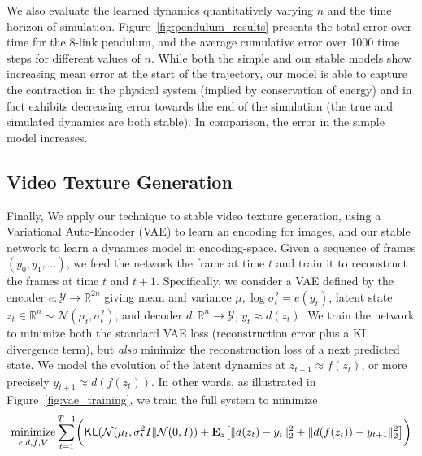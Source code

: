 

We also evaluate the learned dynamics quantitatively varying $n$ and the time horizon of simulation. Figure~\ref{fig:pendulum_results} presents the total error over time for the 8-link pendulum, and the average cumulative error over 1000 time steps for different values of $n$.  While both the simple and our stable models show increasing mean error at the start of the trajectory, our model is able to capture the contraction in the physical system (implied by conservation of energy) and in fact exhibits decreasing error towards the end of the simulation (the true and simulated dynamics are both stable). In comparison, the error in the simple model increases.

\subsection{Video Texture Generation}

Finally, We apply our technique to stable video texture generation, using a Variational Auto-Encoder (VAE) \citep{kingma2013auto} to learn an encoding for images, and our stable network to learn a dynamics model in encoding-space.  Given a sequence of frames $(y_0, y_1, \ldots)$, we feed the network the frame at time $t$
and train it to reconstruct the frames at time $t$ and $t+1$.  Specifically, we consider a VAE defined by the encoder $e : \mathcal{Y} \rightarrow \mathbb{R}^{2n}$ giving mean and variance $\mu, \log \sigma^2_t = e(y_t)$, latent state $z_t \in \mathbb{R}^n \sim \mathcal{N}(\mu_t, \sigma_t^2)$, and decoder $d: \mathbb{R}^n \rightarrow \mathcal{Y}$, $y_t \approx d(z_t)$.  We train the network to minimize both the standard VAE loss (reconstruction error plus a KL divergence term), but \emph{also} minimize the reconstruction loss of a next predicted state. We model the evolution of the latent dynamics at $z_{t+1} \approx f(z_t)$, or more precisely $y_{t+1} \approx d(f(z_t))$.  In other words, as illustrated in Figure~\ref{fig:vae_training}, we train the full system to minimize
\begin{align}
	\operatorname*{minimize}_{e,d,\hat{f},V} \sum_{t=1}^{T-1} \biggl ( \mathsf{KL}(\mathcal{N}(\mu_t,\sigma_t^2 I\|\mathcal{N}(0,I)) + \mathbf{E}_z \bigl [ \|d(z_t) - y_t\|_2^2 + \| d(f(z_t)) - y_{t+1}\|_2^2 \bigr ] \biggr )
\end{align}






